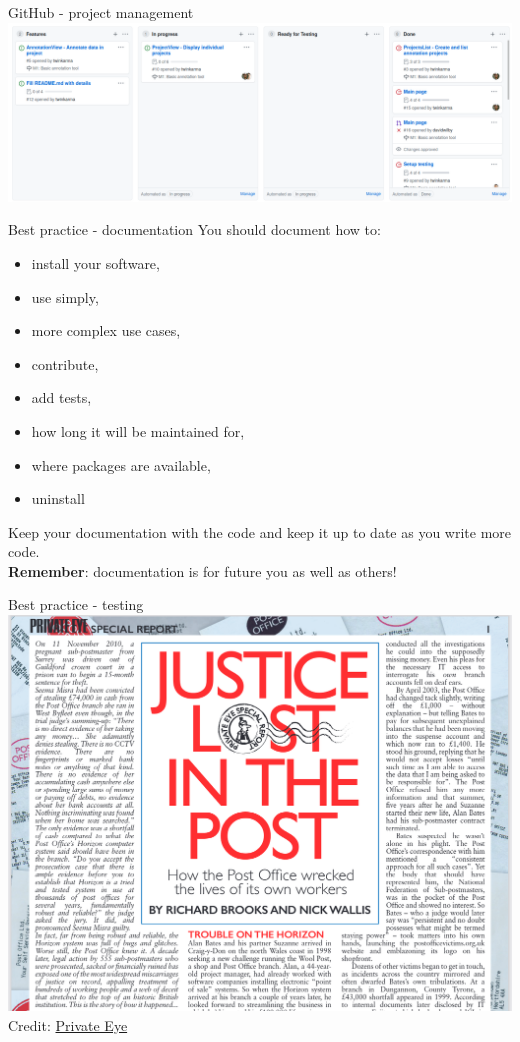 \documentclass{beamer} %
\begin{document}
  \begin{frame}{GitHub - project management}
      \includegraphics[width=1.1\textwidth]{github_projects_screenshot.png}
  \end{frame}

  \begin{frame}{Best practice - documentation}
    You should document how to:
    \begin{itemize}
      \item install your software,
      \item use simply,
      \item more complex use cases,
      \item contribute,
      \item add tests,
      \item how long it will be maintained for,
      \item where packages are available,
      \item uninstall
    \end{itemize}
    Keep your documentation with the code and keep it up to date as you write more code.\\
    \pause
    \textbf{Remember}: documentation is for future you as well as others!
  \end{frame}

  \begin{frame}[fragile]{Best practice - testing}
    \includegraphics[height=0.8\textheight]{post-office-scandal.png}
    \\
    \tiny
    Credit: \href{https://www.private-eye.co.uk/pictures/special_reports/justice-lost-in-the-post.pdf}{Private Eye}
  \end{frame}
\end{document}

